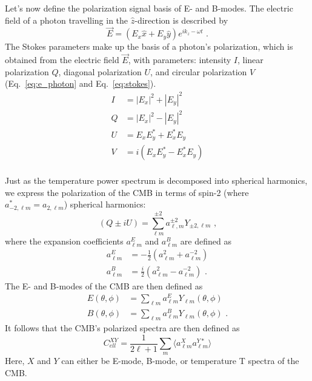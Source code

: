 Let's now define the polarization signal basis of E- and B-modes.  The electric field of a photon travelling in the $\hat{z}$-direction is described by
\begin{equation}
    \Vec{E} = (E_x\hat{x} + E_y\hat{y})e^{i k_z - \omega t } \text{ .}
    \label{eq:e_photon}
\end{equation}
The Stokes parameters make up the basis of a photon's polarization, which is obtained from the electric field $\Vec{E}$, with parameters: intensity $I$, linear polarization $Q$, diagonal polarization $U$, and circular polarization $V$ (Eq.~\ref{eq:e_photon} and Eq.~\ref{eq:stokes}).
\begin{equation}
\begin{split}
    I & = |E_x|^2 + |E_y|^2 \\
    Q & = |E_x|^2 - |E_y|^2 \\
    U & = E_x E_y^* + E_x^*E_y\\
    V & = i(E_x E_y^* - E_x^*E_y) \\
\end{split}
\label{eq:stokes}
\end{equation}



Just as the temperature power spectrum is decomposed into spherical harmonics, we express the polarization of the CMB in terms of spin-2 (where $a^*_{-2,\ell m} = a_{2,\ell m}$) spherical harmonics:
\begin{equation}
(Q \pm iU) = \sum_{\ell m}^{\pm 2} a^{\pm 2}_{\ell ,m} Y_{\pm2,\ell m} \text{ ,}
\end{equation}
where the expansion coefficients $a_{\ell m }^E$ and $a_{\ell m }^B$ are defined as
\begin{equation}
\begin{split}
    a_{\ell m }^E & = -\frac{1}{2}(a_{\ell m}^2 + a_{\ell m}^{-2}) \\
    a_{\ell m }^B & = \frac{i}{2}(a_{\ell m}^2 - a_{\ell m}^{-2}) \text{ .}
\end{split}
\end{equation}
The E- and B-modes of the CMB are then defined as
\begin{equation}
\begin{split}
    E(\theta,\phi) & = \sum_{\ell m} a_{\ell m }^E Y_{\ell m}(\theta,\phi) \\
    B(\theta,\phi) & = \sum_{\ell m} a_{\ell m }^B Y_{\ell m}(\theta,\phi) \text{ .}
\end{split}
\end{equation}
It follows that the CMB's polarized spectra are then defined as
\begin{equation}
    C_{ell}^{XY} = \frac{1}{2\ell+1}\sum_m \langle a_{\ell m}^{X} a_{\ell m}^{Y*} \rangle 
\end{equation}
Here, $X$ and $Y$ can either be E-mode, B-mode, or temperature T spectra of the CMB.

